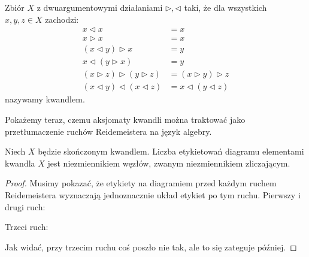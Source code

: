 \begin{definition}
    Zbiór $X$ z dwuargumentowymi działaniami $\triangleright, \triangleleft$ taki, że dla wszystkich $x, y, z \in X$ zachodzi:
    \begin{align}
    x \triangleleft x & = x \\
    x \triangleright x & = x \\
    (x \triangleleft y) \triangleright x & = y \\
    x \triangleleft (y \triangleright x) & = y \\
     (x \triangleright z) \triangleright (y \triangleright z) & = (x \triangleright y) \triangleright z \\
    (x \triangleleft y) \triangleleft (x \triangleleft z) & = x \triangleleft (y \triangleleft z)
    \end{align}
    nazywamy kwandlem.
\end{definition}

Pokażemy teraz, czemu aksjomaty kwandli można traktować jako przetłumaczenie ruchów Reidemeistera na język algebry.
%

\begin{proposition}
%
    Niech $X$ będzie skończonym kwandlem.
    Liczba etykietowań diagramu elementami kwandla $X$ jest niezmiennikiem węzłów, zwanym niezmiennikiem zliczającym.
\end{proposition}

\begin{proof}
    Musimy pokazać, że etykiety na diagramiem przed każdym ruchem Reidemeistera wyznaczają jednoznacznie układ etykiet po tym ruchu.
    Pierwszy i drugi ruch:

\noindent
Trzeci ruch:

\noindent
Jak widać, przy trzecim ruchu coś poszło nie tak, ale to się zateguje później.
\end{proof}

